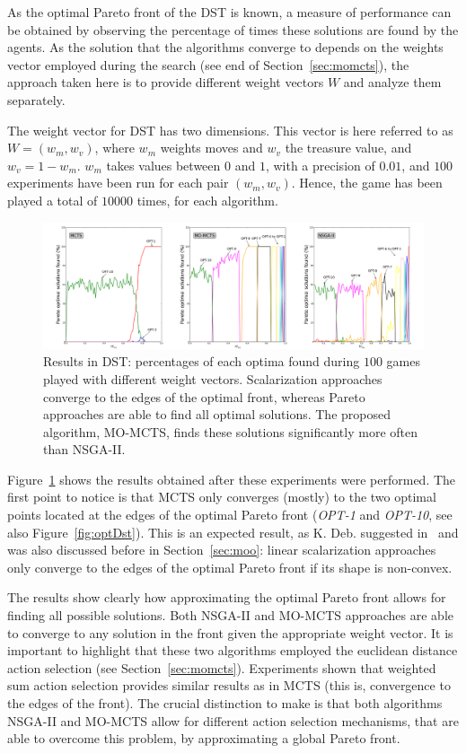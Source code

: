 \documentclass[journal]{IEEEtran}
\begin{document}
As the optimal Pareto front of the DST is known, a measure of performance can be obtained by observing the percentage of times these solutions are found by the agents. As the solution that the algorithms converge to depends on the weights vector employed during the search (see end of Section~\ref{sec:momcts}), the approach taken here is to provide different weight vectors $W$ and analyze them separately.  

The weight vector for DST has two dimensions. This vector is here referred to as $W = (w_m, w_v)$, where $w_m$ weights moves and $w_v$ the treasure value, and $w_v = 1 - w_m$. $w_m$ takes values between $0$ and $1$, with a precision of $0.01$, and $100$ experiments have been run for each pair $(w_m, w_v)$. Hence, the game has been played a total of $10000$ times, for each algorithm.


\begin{figure}[!t]
	\centering
	\includegraphics[width=2.1\columnwidth]{img/dstAll}
	\caption{Results in DST: percentages of each optima found during $100$ games played with different weight vectors. Scalarization approaches converge to the edges of the optimal front, whereas Pareto approaches are able to find all optimal solutions. The proposed algorithm, MO-MCTS, finds these solutions significantly more often than NSGA-II.}
	\label{fig:extCase}
\end{figure}

Figure~\ref{fig:extCase} shows the results obtained after these experiments were performed. The first point to notice is that MCTS only converges (mostly) to the two optimal points located at the edges of the optimal Pareto front (\textit{OPT-1} and \textit{OPT-10}, see also Figure~\ref{fig:optDst}). This is an expected result, as K. Deb. suggested in~\cite{Deb2001} and was also discussed before in Section~\ref{sec:moo}: linear scalarization approaches only converge to the edges of the optimal Pareto front if its shape is non-convex.

The results show clearly how approximating the optimal Pareto front allows for finding all possible solutions. Both NSGA-II and MO-MCTS approaches are able to converge to any solution in the front given the appropriate weight vector. It is important to highlight that these two algorithms employed the euclidean distance action selection (see Section~\ref{sec:momcts}). Experiments shown that weighted sum action selection provides similar results as in MCTS (this is, convergence to the edges of the front). The crucial distinction to make is that both algorithms NSGA-II and MO-MCTS allow for different action selection mechanisms, that are able to overcome this problem, by approximating a global Pareto front.
\end{document}
